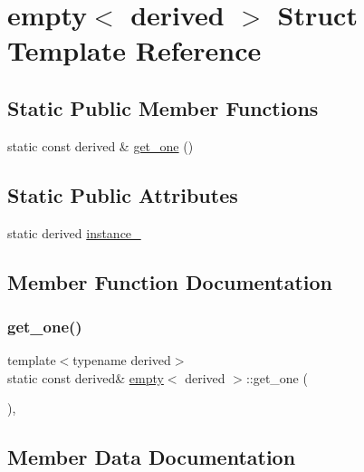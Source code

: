 \hypertarget{structempty}{}\section{empty$<$ derived $>$ Struct Template Reference}
\label{structempty}
\subsection*{Static Public Member Functions}
\begin{DoxyCompactItemize}
\item 
static const derived \& \mbox{\hyperlink{structempty_a6b8a643bdc004dd81bd6c17b9937143e}{get\+\_\+one}} ()
\end{DoxyCompactItemize}
\subsection*{Static Public Attributes}
\begin{DoxyCompactItemize}
\item 
static derived \mbox{\hyperlink{structempty_a7419c4ca543a997160879326cd095ee1}{instance\+\_\+}}
\end{DoxyCompactItemize}


\subsection{Member Function Documentation}
\mbox{\label{structempty_a6b8a643bdc004dd81bd6c17b9937143e}} 
\subsubsection{\texorpdfstring{get\_one()}{get\_one()}}
{\footnotesize\ttfamily template$<$typename derived$>$ \\
static const derived\& \mbox{\hyperlink{structempty}{empty}}$<$ derived $>$\+::get\+\_\+one (\begin{DoxyParamCaption}{ }\end{DoxyParamCaption})\hspace{0.3cm}{\ttfamily [inline]}, {\ttfamily [static]}}



\subsection{Member Data Documentation}
\mbox{\label{structempty_a7419c4ca543a997160879326cd095ee1}} 

